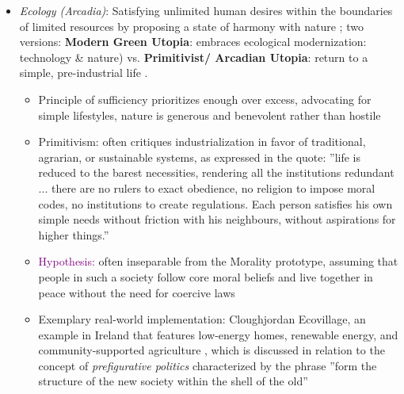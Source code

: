 \documentclass[jou,floatsintext]{apa7}
\begin{document}
\begin{itemize}
\begin{itemize}
    \item \textit{Ecology (Arcadia)}: Satisfying unlimited human desires within the boundaries of limited resources by proposing a state of harmony with nature \parencite{fernandoGreensSpaceInvaders2020}; two versions: \textbf{Modern Green Utopia}: embraces ecological modernization: technology \& nature) vs. \textbf{Primitivist/ Arcadian Utopia}: return to a simple, pre-industrial life \parencite{almudiEconomicsUtopiaCoevolutionary2017, fernandoGreensSpaceInvaders2020}.
    \begin{itemize}
        \item Principle of sufficiency prioritizes enough over excess, advocating for simple lifestyles, nature is generous and benevolent rather than hostile \parencite{aviles14LawBasedUtopia2001, kashimaCollectiveFutureThinking2025}
        \item Primitivism: often critiques industrialization in favor of traditional, agrarian, or sustainable systems, as expressed in the quote: ''life is reduced to the barest necessities, rendering all the institutions redundant ... there are no rulers to exact obedience, no religion to impose moral codes, no institutions to create regulations. Each person satisfies his own simple needs without friction with his neighbours, without aspirations for higher things.'' \parencite{aviles14LawBasedUtopia2001}
        \item \textcolor{purple}{Hypothesis:} often inseparable from the Morality prototype, assuming that people in such a society follow core moral beliefs and live together in peace without the need for coercive laws \parencite[see empirical results in][]{fernandoProfilesIdealSociety2023}
        \item[$\rightarrow$] Exemplary real-world implementation: Cloughjordan Ecovillage, an example in Ireland that features low-energy homes, renewable energy, and community-supported agriculture \parencite{caseyPrefiguringSustainableLiving2020}, which is discussed in relation to the concept of \textit{prefigurative politics} characterized by the phrase ''form the structure of the new society within the shell of the old'' \parencite[e.g.,][]{clarkeEmergentPrefigurativePolitics2025, gerberBuildingNewWorld2025}
    \end{itemize}


\end{itemize}
\end{itemize}
\end{document}
